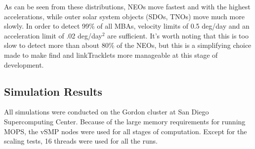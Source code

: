As can be seen from these distributions, NEOs move fastest and with
the highest accelerations, while outer solar system objects (SDOs,
TNOs) move much more slowly.  In order to detect 99\% of all MBAs,
velocity limits of 0.5 deg/day and an acceleration limit of 
.02 deg/day$^2$ are sufficient. It's worth noting that this is too
slow to detect more than about 80\% of the NEOs, but this is a
simplifying choice made to make find and linkTracklets more manageable
at this stage of development. 



\subsection{Simulation Results}

All simulations were conducted on the Gordon cluster at San Diego
Supercomputing Center.  Because of the large memory requirements for
running MOPS, the vSMP nodes were used for all stages of computation.
Except for the scaling tests, 16 threads were used for all the runs.


